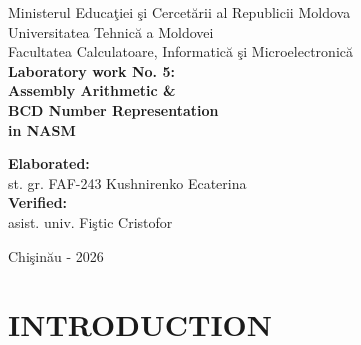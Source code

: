 \documentclass[12pt,a4paper]{article}
\begin{document}
\begin{titlepage}
    \centering
    \vspace*{1cm}
    {\Large Ministerul Educa\c{t}iei \c{s}i Cercet\u{a}rii al Republicii Moldova\\}
    \vspace{0.5cm}
    {\Large Universitatea Tehnic\u{a} a Moldovei\\}
    \vspace{0.5cm}
    {\Large Facultatea Calculatoare, Informatic\u{a} \c{s}i Microelectronic\u{a}\\}
    \vspace{3cm}
    {\LARGE \textbf{Laboratory work No. 5:}\\}
    \vspace{0.5cm}
    {\LARGE \textbf{Assembly Arithmetic \&}\\}
    \vspace{0.3cm}
    {\LARGE \textbf{BCD Number Representation}\\}
    \vspace{0.3cm}
    {\LARGE \textbf{in NASM}\\}
    \vfill
    \begin{flushleft}
    \hspace{7cm}\textbf{Elaborated:}\\
    \hspace{7cm}st. gr. FAF-243 Kushnirenko Ecaterina\\
    \vspace{1cm}
    \hspace{7cm}\textbf{Verified:}\\
    \hspace{7cm}asist. univ. Fi\c{s}tic Cristofor\\
    \end{flushleft}
    \vspace{1cm}
    {\large Chi\c{s}in\u{a}u - 2026}
\end{titlepage}

\newpage
\tableofcontents
\thispagestyle{empty}

\newpage
\setcounter{page}{3}

\section{INTRODUCTION}
\end{document}
